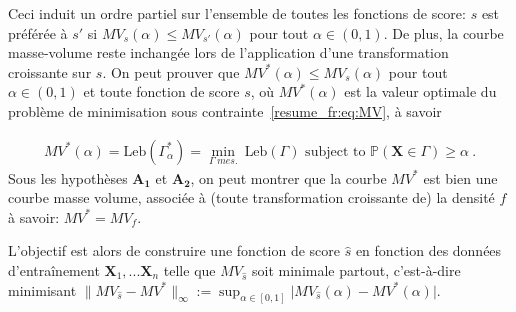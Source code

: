 \documentclass[a4paper, 12pt]{article}
\def\mb{\mathbf}
\def\leb{\text{Leb}}
\begin{document}
Ceci induit un ordre partiel sur l'ensemble de toutes les fonctions de score: $ s $ est préférée à $s'$ si $MV_{s}(\alpha) \le MV_{s'}(\alpha)$ pour tout $\alpha \in (0,1) $. De plus, la courbe masse-volume reste inchangée lors de l'application d'une transformation croissante sur $ s $.
On peut prouver que $ MV ^ * (\alpha) \leq MV_s (\alpha) $ pour tout $ \alpha \in (0,1) $ et toute fonction de score $ s $, où $ MV ^ * (\alpha ) $ est la valeur optimale du problème de minimisation sous contrainte~\eqref{resume_fr:eq:MV}, à savoir

%
\begin{align}
\label{resume_fr:def:MV}
MV^*(\alpha)= \leb(\Gamma_\alpha^*)=\min_{\Gamma~ mes.} ~\leb(\Gamma) \mbox{~subject to~} \mathbb{P}(\mb X \in \Gamma) \ge \alpha~.
\end{align}
%
Sous les hypothèses $ \mathbf {A_1} $ et $ \mathbf {A_2} $, on peut montrer que la courbe $ MV^ * $ est bien une courbe masse volume, associée à (toute transformation croissante de) la densité $f$ à savoir: $ MV ^ * = MV_f $.

L'objectif est alors de construire une fonction de score $ \hat s $ en fonction des données d'entraînement $ \mb X_1, ... \mb X_n $ telle que $ MV_{\hat s} $ soit minimale partout, 
c'est-à-dire minimisant $\|MV_{\hat s}-MV^*\|_{\infty}:=\sup_{\alpha\in[0,1]}\vert MV_{\hat s}(\alpha)-MV^*(\alpha)\vert$.
\end{document}
